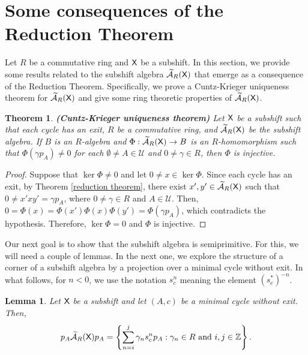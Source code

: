 \documentclass[a4paper,12pt]{amsart}
\newtheorem{theorem}[equation]{Theorem}
\newtheorem{lemma}[equation]{Lemma}
\theoremstyle{definition}
\theoremstyle{remark}
\numberwithin{equation}{section}
\newcommand{\osf}{{\normalfont \textsf{X}}}
\newcommand{\ualgshift}{\TCA_R(\osf)}
\newcommand{\Z}{\mathbb{Z}}
\newcommand{\CA}{\mathcal{A}}
\newcommand{\TCA}{\widetilde{\CA}}
\newcommand{\TCB}{\mathcal{U}}
\begin{document}
\section{Some consequences of the Reduction Theorem}\label{consequencesofreduction}

Let $R$ be a commutative ring and $\osf$ be a subshift. In this section, we provide some results related to the subshift algebra $\ualgshift$ that emerge as a consequence of the Reduction Theorem. Specifically, we prove a Cuntz-Krieger uniqueness theorem for $\ualgshift$ and give some ring theoretic properties of $\ualgshift$.

\begin{theorem}\label{ckuniqueness}{\rm {\bf (Cuntz-Krieger uniqueness theorem)}} Let $\osf$ be a subshift such that each cycle has an exit, $R$ be a commutative ring, and $\ualgshift$ be the subshift algebra. If $B$ is an $R$-algebra and $\Phi:\ualgshift\rightarrow B$ is an $R$-homomorphism such that $\Phi(\gamma p_A)\neq 0$ for each $\emptyset \neq A\in \TCB$ and $0\neq \gamma \in R$,  then $\Phi$ is injective.
\end{theorem}

\begin{proof} Suppose that $\operatorname{ker}\Phi\neq 0$ and let $0\neq x\in \operatorname{ker}\Phi$. Since each cycle has an exit, by Theorem \ref{reduction theorem}, there exist $x',y'\in \ualgshift$ such that $0\neq x'xy'=\gamma p_A$, where $0\neq \gamma\in R$ and $ A\in \TCB$. Then, $0=\Phi(x)=\Phi(x')\Phi(x)\Phi(y')=\Phi(\gamma p_A)$, which contradicts the hypothesis. Therefore, $\operatorname{ker}\Phi=0$ and $\Phi$ is injective.
\end{proof}


Our next goal is to show that the subshift algebra is semiprimitive. For this, we will need a couple of lemmas. 
In the next one, we explore the structure of a corner of a subshift algebra by a projection over a minimal cycle without exit. In what follows, for $n<0$, we use the notation $s_c^n$ meaning the element $(s_c^*)^{-n}$. 


\begin{lemma}\label{cornerlemma} Let $\osf$ be a subshift and let $(A,c)$ be a minimal cycle without exit. Then, $$p_A \ualgshift p_A=\left\{\sum\limits_{n=i}^j\gamma_n s_c^np_A: \gamma_n\in R \text{ and }i,j\in \Z\right\}.$$
\end{lemma}
\end{document}
